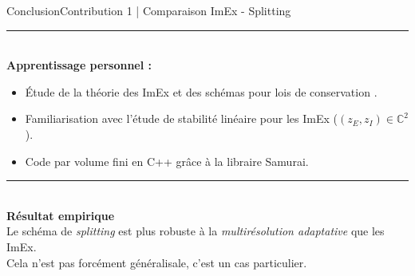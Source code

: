 \begin{frame}{Conclusion}{Contribution 1 | Comparaison ImEx - Splitting}
    \noindent\color{Primary}\rule{\linewidth}{0.6pt}\color{black}\\
    \textbf{Apprentissage personnel : }\\
    \begin{itemize}
        \item Étude de la théorie des ImEx \cite{Hairer1981,ASCHER1997151,KENNEDY2003139} et des schémas pour lois de conservation \cite{LeVeque1990}.
        \item Familiarisation avec l'étude de stabilité linéaire pour les ImEx ($(z_E,z_I) \in \mathbb{C}^2$).
        \item Code par volume fini en C++ grâce à la libraire Samurai.
    \end{itemize}
    \noindent\color{Primary}\rule{\linewidth}{0.6pt}\color{black}\\
    \textbf{Résultat empirique}\\
        Le schéma de \emph{splitting} est plus robuste à la \emph{multirésolution adaptative} que les ImEx.\\
        \scriptsize{Cela n'est pas forcément généralisale, c'est un cas particulier.}
\end{frame}